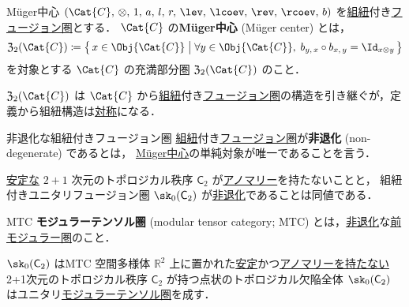 \documentclass[TQFT_main]{subfiles}
\begin{document}
\begin{mydef}[label=def:Muger-center]{M\"{u}ger中心}
    $(\Cat{C},\, \otimes,\, 1,\, a,\, l,\, r,\, \lev,\, \lcoev,\, \rev,\, \rcoev,\, b)$ を\hyperref[redef:braided-monoidal]{組紐}付き\hyperref[def:tensorfusion-cat]{フュージョン圏}とする．
    $\Cat{C}$ の\textbf{M\"{u}ger中心} (M\"{u}ger center) とは，
    \begin{align}
        \mathfrak{Z}_2 (\Cat{C}) \coloneqq \bigl\{\, x \in \Obj{\Cat{C}} \bigm| \forall y \in \Obj{\Cat{C}},\; b_{y,\, x} \circ b_{x,\, y} = \Id_{x \otimes y} \,\bigr\} 
    \end{align}
    を対象とする $\Cat{C}$ の充満部分圏 $\mathfrak{Z}_2 (\Cat{C})$ のこと．
\end{mydef}
$\mathfrak{Z}_2 (\Cat{C})$ は $\Cat{C}$ から\hyperref[redef:braided-monoidal]{組紐}付き\hyperref[def:tensorfusion-cat]{フュージョン圏}の構造を引き継ぐが，定義から組紐構造は\hyperref[redef:braided-monoidal]{対称}になる．

\begin{mydef}[label=def:nondegen-BFC]{非退化な組紐付きフュージョン圏}
    \hyperref[redef:braided-monoidal]{組紐}付き\hyperref[def:tensorfusion-cat]{フュージョン圏}が\textbf{非退化} (non-degenerate) であるとは，
    \hyperref[def:Muger-center]{M\"{u}ger中心}の単純対象が唯一であることを言う．
\end{mydef}

\begin{mypropph}[label=prop:remote-detectable]{}
    \hyperref[def:stable]{安定な} $2+1$ 次元のトポロジカル秩序 $\mathsf{C}_2$ が\hyperref[def:anomalyQP]{アノマリー}を持たないことと，
    組紐付きユニタリフュージョン圏 $\sk_0(\mathsf{C}_2)$ が\hyperref[def:nondegen-BFC]{非退化}であることは同値である．
\end{mypropph}

\begin{mydef}[label=def:MTC]{MTC}
    \textbf{モジュラーテンソル圏} (modular tensor category; MTC) とは，\hyperref[def:nondegen-BFC]{非退化}な\hyperref[def:premodular-cat]{前モジュラー圏}のこと．
\end{mydef}

\begin{mypropph}[label=prop:sk0-braided]{$\sk_0(\mathsf{C}_2)$ はMTC}
    空間多様体 $\mathbb{R}^2$ 上に置かれた\hyperref[def:stable]{安定}かつ\hyperref[def:anomalyQP]{アノマリーを持たない} 2+1次元のトポロジカル秩序 $\mathsf{C}_2$ が持つ点状のトポロジカル欠陥全体
    $\sk_0(\mathsf{C}_2)$ はユニタリ\hyperref[def:MTC]{モジュラーテンソル圏}を成す．
\end{mypropph}
\end{document}
